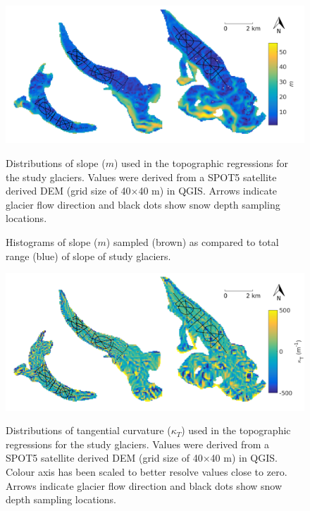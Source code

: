 \documentclass[12pt]{article}
\newcommand{\topomap}{Arrows indicate glacier flow direction and black dots show snow depth sampling locations.}
\begin{document}
\begin{figure}[H]
	\centering
	\includegraphics[width=\textwidth]{Map_slope.png}\\
	\caption{Distributions of slope ($m$) used in the topographic regressions for the study glaciers. Values were derived from a SPOT5 satellite derived DEM (grid size of 40$\times$40 m) in QGIS. \topomap}
	\label{map:slope}
\end{figure}

\begin{figure}[H]
	\caption{Histograms of slope ($m$) sampled (brown) as compared to total range (blue) of slope of study glaciers.}
	\label{sampledRange:slope}
\end{figure}

\begin{figure}[H]
	\centering
	\includegraphics[width=\textwidth]{Map_tangentCurve.png}\\
	\caption{Distributions of tangential curvature ($\kappa_T$) used in the topographic regressions for the study glaciers. Values were derived from a SPOT5 satellite derived DEM (grid size of 40$\times$40 m) in QGIS. Colour axis has been scaled to better resolve values close to zero. \topomap}
	\label{map:tangentC}
\end{figure}
\end{document}
